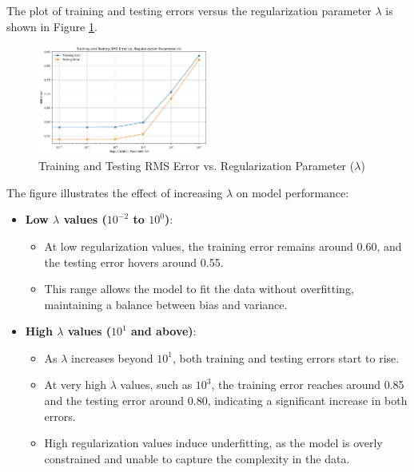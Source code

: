 \documentclass{article}
\begin{document}
	The plot of training and testing errors versus the regularization parameter $\lambda$ is shown in Figure \ref{fig:regularization_error_plot}. 
	
	\begin{figure}[h!]
		\centering
		\includegraphics[width=0.5\textwidth]{images/q4_part3.png} %
		\caption{Training and Testing RMS Error vs. Regularization Parameter ($\lambda$)}
		\label{fig:regularization_error_plot}
	\end{figure}
	
	The figure illustrates the effect of increasing $\lambda$ on model performance:
	
	\begin{itemize}
		\item \textbf{Low $\lambda$ values ($10^{-2}$ to $10^{0}$)}:
		\begin{itemize}
			\item At low regularization values, the training error remains around 0.60, and the testing error hovers around 0.55.
			\item This range allows the model to fit the data without overfitting, maintaining a balance between bias and variance.
		\end{itemize}
		
		\item \textbf{High $\lambda$ values ($10^{1}$ and above)}:
		\begin{itemize}
			\item As $\lambda$ increases beyond $10^{1}$, both training and testing errors start to rise.
			\item At very high $\lambda$ values, such as $10^{3}$, the training error reaches around 0.85 and the testing error around 0.80, indicating a significant increase in both errors.
			\item High regularization values induce underfitting, as the model is overly constrained and unable to capture the complexity in the data.
		\end{itemize}
	\end{itemize}
	
\end{document}
